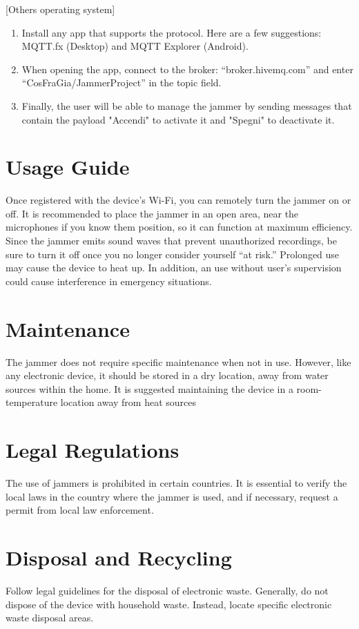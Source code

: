 [Others operating system]
\begin{enumerate}
    \item Install any app that supports the protocol. Here are a few suggestions: MQTT.fx
    (Desktop) and MQTT Explorer (Android).
    \item When opening the app, connect to the broker: “broker.hivemq.com” and enter
    “CosFraGia/JammerProject” in the topic field.
    \item Finally, the user will be able to manage the jammer by sending messages that
    contain the payload "Accendi" to activate it and "Spegni" to deactivate it.
\end{enumerate}

\section{Usage Guide}
Once registered with the device’s Wi-Fi, you can remotely turn the jammer on or off.
It is recommended to place the jammer in an open area, near the microphones if you know
them position, so it can function at maximum efficiency.
Since the jammer emits sound waves that prevent unauthorized recordings, be sure to turn
it off once you no longer consider yourself “at risk.”
Prolonged use may cause the device to heat up. In addition, an use without user’s
supervision could cause interference in emergency situations.

\section{Maintenance}
The jammer does not require specific maintenance when not in use.
However, like any electronic device, it should be stored in a dry location, away from water
sources within the home.
It is suggested maintaining the device in a room-temperature location away from heat
sources

\section{Legal Regulations}
The use of jammers is prohibited in certain countries.
It is essential to verify the local laws in the country where the jammer is used, and if
necessary, request a permit from local law enforcement.

\section{Disposal and Recycling}
Follow legal guidelines for the disposal of electronic waste. Generally, do not dispose of the
device with household waste. Instead, locate specific electronic waste disposal areas.
 
